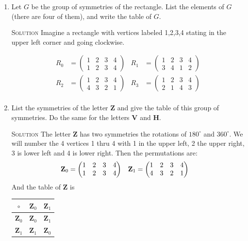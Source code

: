 \documentclass[twoside]{amsart}
\newcommand{\solution}{\textsc{Solution}\xspace}
\begin{document}
\begin{enumerate}[A.]
\begin{enumerate}[1]
      \vspace{5pt}
      \item Let $G$ be the group of symmetries of the rectangle. List the
      elements of $G$ (there are four of them), and write the table of $G$.

      \solution Imagine a rectangle with vertices labeled 1,2,3,4 stating
      in the upper left corner and going clockwise.

      \begin{align*}
         R_0 &= \begin{pmatrix}
	           1 & 2 & 3 & 4 \\
		   1 & 2 & 3 & 4
		\end{pmatrix}
		&
         R_1 &= \begin{pmatrix}
	           1 & 2 & 3 & 4 \\
		   3 & 4 & 1 & 2
		\end{pmatrix} \\
         R_2 &= \begin{pmatrix}
	           1 & 2 & 3 & 4 \\
		   4 & 3 & 2 & 1
		\end{pmatrix}
		&
         R_3 &= \begin{pmatrix}
	           1 & 2 & 3 & 4 \\
		   2 & 1 & 4 & 3
		\end{pmatrix} \\
      \end{align*}

      \item List the symmetries of the letter \textbf{Z} and give
      the table of this group of symmetries. Do the same for the letters
      \textbf{V} and \textbf{H}.

      \solution The letter \textbf{Z} has two symmetries the rotations of
      $180^\circ$ and $360^\circ$. We will number the 4 vertices 
      1 thru 4 with 1 in the upper left, 2 the upper right, 3 is lower left and
      4 is lower right. Then the permutations are:
      \begin{align*}
         \text{\textbf{Z}}_0 &= \begin{pmatrix}
	                        1 & 2 & 3 & 4 \\
				1 & 2 & 3 & 4
				\end{pmatrix}
				&
	 \text{\textbf{Z}}_1 &= \begin{pmatrix}
	                        1 & 2 & 3 & 4 \\
				4 & 3 & 2 & 1
				\end{pmatrix}
      \end{align*}
      And the table of \textbf{Z} is
      \begin{tabular}{c|cc}
        $\circ$ & $\textbf{Z}_0$ & $\textbf{Z}_1$ \\ \hline
	$\textbf{Z}_0$ & $\textbf{Z}_0$ & $\textbf{Z}_1$ \\
	$\textbf{Z}_1$ & $\textbf{Z}_1$ & $\textbf{Z}_0$ \\
      \end{tabular}


\end{enumerate}
\end{enumerate}
\end{document}
